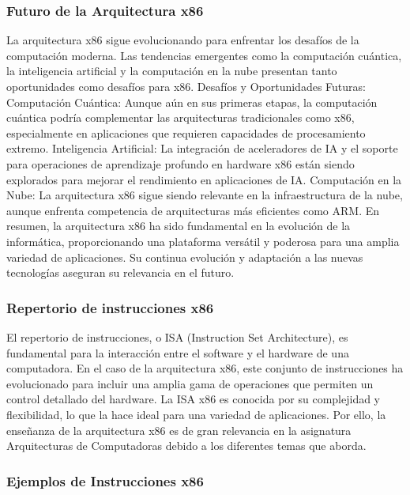 \documentclass[12pt,twoside]{templates/unerthesis}
\begin{document}
\hypertarget{futuro-de-la-arquitectura-x86}{%
\subsubsection{Futuro de la Arquitectura x86}\label{futuro-de-la-arquitectura-x86}}

La arquitectura x86 sigue evolucionando para enfrentar los desafíos de la computación moderna. Las tendencias emergentes como la computación cuántica, la inteligencia artificial y la computación en la nube presentan tanto oportunidades como desafíos para x86.
Desafíos y Oportunidades Futuras:
Computación Cuántica: Aunque aún en sus primeras etapas, la computación cuántica podría complementar las arquitecturas tradicionales como x86, especialmente en aplicaciones que requieren capacidades de procesamiento extremo.
Inteligencia Artificial: La integración de aceleradores de IA y el soporte para operaciones de aprendizaje profundo en hardware x86 están siendo explorados para mejorar el rendimiento en aplicaciones de IA.
Computación en la Nube: La arquitectura x86 sigue siendo relevante en la infraestructura de la nube, aunque enfrenta competencia de arquitecturas más eficientes como ARM.
En resumen, la arquitectura x86 ha sido fundamental en la evolución de la informática, proporcionando una plataforma versátil y poderosa para una amplia variedad de aplicaciones. Su continua evolución y adaptación a las nuevas tecnologías aseguran su relevancia en el futuro.

\hypertarget{repertorio-de-instrucciones-x86}{%
\subsubsection{Repertorio de instrucciones x86}\label{repertorio-de-instrucciones-x86}}

El repertorio de instrucciones, o ISA (Instruction Set Architecture), es fundamental para la interacción entre el software y el hardware de una computadora. En el caso de la arquitectura x86, este conjunto de instrucciones ha evolucionado para incluir una amplia gama de operaciones que permiten un control detallado del hardware. La ISA x86 es conocida por su complejidad y flexibilidad, lo que la hace ideal para una variedad de aplicaciones.
Por ello, la enseñanza de la arquitectura x86 es de gran relevancia en la asignatura Arquitecturas de Computadoras debido a los diferentes temas que aborda.

\hypertarget{ejemplos-de-instrucciones-x86}{%
\subsubsection{Ejemplos de Instrucciones x86}\label{ejemplos-de-instrucciones-x86}}
\end{document}
